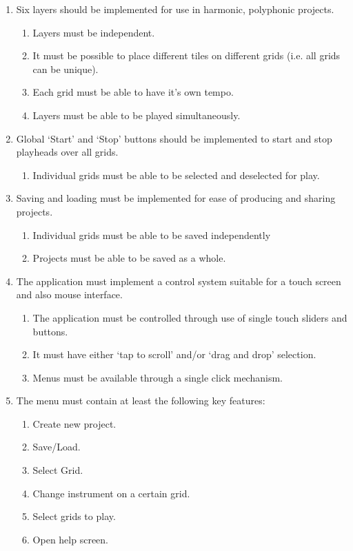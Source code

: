 \documentclass[10pt,a4paper]{article}
\begin{document}
\begin{enumerate}
\item Six layers should be implemented for use in harmonic, polyphonic projects.
\begin{enumerate}
\item Layers must be independent.
\item It must be possible to place different tiles on different grids (i.e. all grids can be unique).
\item Each grid must be able to have it's own tempo.
\item Layers must be able to be played simultaneously.
\end{enumerate}

\item Global `Start' and `Stop' buttons should be implemented to start and stop playheads over all grids.
\begin{enumerate}
\item Individual grids must be able to be selected and deselected for play.
\end{enumerate}

\item Saving and loading must be implemented for ease of producing and sharing projects.
\begin{enumerate}
\item Individual grids must be able to be saved independently
\item Projects must be able to be saved as a whole.
\end{enumerate}

\item The application must implement a control system suitable for a touch screen and also mouse interface.
\begin{enumerate}
\item The application must be controlled through use of single touch sliders and buttons.
\item It must have either `tap to scroll' and/or `drag and drop' selection.
\item Menus must be available through a single click mechanism.
\end{enumerate}

\item The menu must contain at least the following key features:
\begin{enumerate}
\item Create new project.
\item Save/Load.
\item Select Grid.
\item Change instrument on a certain grid.
\item Select grids to play.
\item Open help screen.
\end{enumerate}

\end{enumerate}
\end{document}
